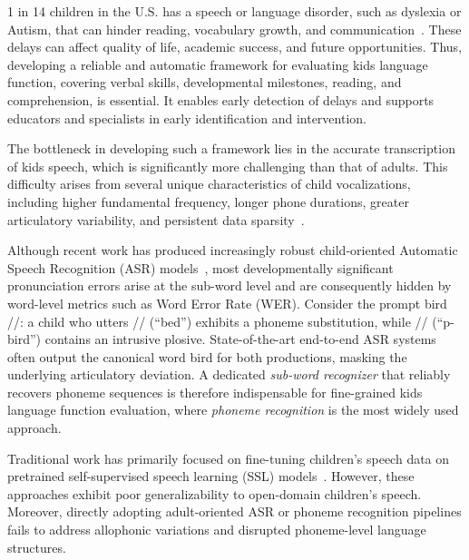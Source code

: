 1 in 14 children in the U.S. has a speech or language disorder, such as dyslexia or Autism, that can hinder reading, vocabulary growth, and communication~\cite{nidcd2023, cde2024, crossriver2024, gorno2011classification-ppa}. These delays can affect quality of life, academic success, and future opportunities. Thus, developing a reliable and automatic framework for evaluating kids language function, covering verbal skills, developmental milestones, reading, and comprehension, is essential. It enables early detection of delays and supports educators and specialists in early identification and intervention.


The bottleneck in developing such a framework lies in the accurate transcription of kids speech, which is significantly more challenging than that of adults. This difficulty arises from several unique characteristics of child vocalizations, including higher fundamental frequency, longer phone durations, greater articulatory variability, and persistent data sparsity~\cite{lee1997analysis, tran2020analysis, neuberger2014cross, gerosa2009review, yeung2018difficulties, shankar2025selective}. 

Although recent work has produced increasingly robust child-oriented Automatic Speech Recognition (ASR) models~\cite{fan2024benchmarking, bhardwaj2022automatic, shahnawazuddin2024developing, singh2025causal, singh2021data, kathania2022formant, fan2022towards, xu24c_interspeech, kim2021conditionalvariationalautoencoderadversarial}, most developmentally significant pronunciation errors arise at the sub-word level and are consequently hidden by word-level metrics such as Word Error Rate (WER). Consider the prompt bird //: a child who utters // (“bed”) exhibits a phoneme substitution, while // (“p-bird”) contains an intrusive plosive. State-of-the-art end-to-end ASR systems often output the canonical word bird for both productions, masking the underlying articulatory deviation. A dedicated \textit{sub-word recognizer} that reliably recovers phoneme sequences is therefore indispensable for fine-grained kids language function evaluation, where \textit{phoneme recognition} is the most widely used approach.

Traditional work has primarily focused on fine-tuning children's speech data on pretrained self-supervised speech learning (SSL) models~\cite{li2024enhancingchildvocalizationclassification, li2024analysisselfsupervisedspeechmodels, Shi-JASAEL-2024, gao2024g2pu, peng2023study, 10971198, zhu2022phone-w2v2-alignment, zhao-etal-2025-mutis, mohamed2022selfreview, hsu2021hubert, Chen_2022}. However, these approaches exhibit poor generalizability to open-domain children's speech. Moreover, directly adopting adult-oriented ASR or phoneme recognition pipelines fails to address allophonic variations and disrupted phoneme-level language structures. 

